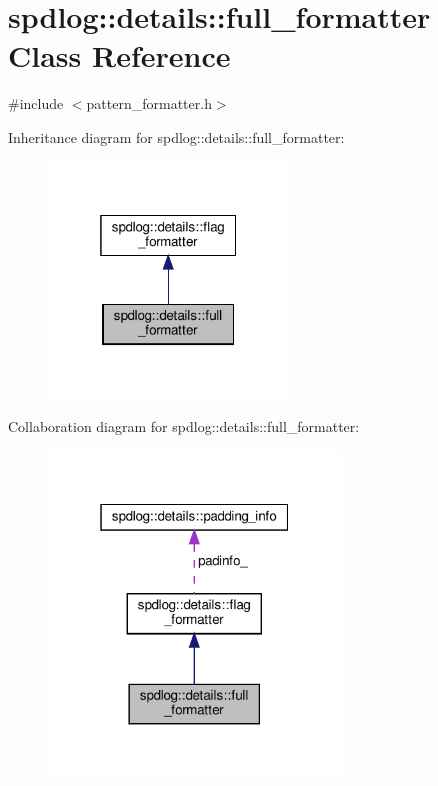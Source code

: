 \hypertarget{classspdlog_1_1details_1_1full__formatter}{}\section{spdlog\+:\+:details\+:\+:full\+\_\+formatter Class Reference}
\label{classspdlog_1_1details_1_1full__formatter}


{\ttfamily \#include $<$pattern\+\_\+formatter.\+h$>$}



Inheritance diagram for spdlog\+:\+:details\+:\+:full\+\_\+formatter\+:
\nopagebreak
\begin{figure}[H]
\begin{center}
\leavevmode
\includegraphics[width=181pt]{classspdlog_1_1details_1_1full__formatter__inherit__graph}
\end{center}
\end{figure}


Collaboration diagram for spdlog\+:\+:details\+:\+:full\+\_\+formatter\+:
\nopagebreak
\begin{figure}[H]
\begin{center}
\leavevmode
\includegraphics[width=220pt]{classspdlog_1_1details_1_1full__formatter__coll__graph}
\end{center}
\end{figure}
